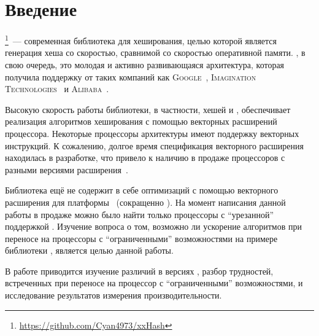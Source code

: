 
\section*{Введение}
\thispagestyle{withCompileDate}

\xxHash{}\footnote{\url{https://github.com/Cyan4973/xxHash}}~--- современная библиотека для хеширования, целью которой является генерация хеша со скоростью, сравнимой со скоростью оперативной памяти.
\riscv{}, в свою очередь, это молодая и активно развивающаяся архитектура, которая получила поддержку от таких компаний как \textsc{Google}~\cite{GoogleAnnouncesOfficial}, \textsc{Imagination Technologies}~\cite{WhyWeVe} и \textsc{Alibaba}~\cite{robinsonAlibabaLaunchesRISCV}.

Высокую скорость работы библиотеки, в частности, хешей  и , обеспечивает реализация алгоритмов хеширования с помощью векторных расширений процессора.
Некоторые процессоры архитектуры \riscv{} имеют поддержку векторных инструкций.
К сожалению, долгое время спецификация векторного расширения находилась в разработке, что привело к наличию в продаже процессоров с разными версиями расширения~\cite{ImplicationsWidelyDistributed}.

Библиотека \xxHash{} ещё не содержит в себе оптимизаций с помощью векторного расширения для платформы \riscv{}~(сокращенно \rvv{}).
На момент написания данной работы в продаже можно было найти только процессоры с \enquote{урезанной} поддержкой \rvv{}.
Изучение вопроса о том, возможно ли ускорение алгоритмов при переносе на процессоры с \enquote{ограниченными} возможностями на примере библиотеки \xxHash{}, является целью данной работы.

В работе приводится изучение различий в версиях \rvv{}, разбор трудностей, встреченных при переносе на процессор с \enquote{ограниченными} возможностями, и исследование результатов измерения производительности.
